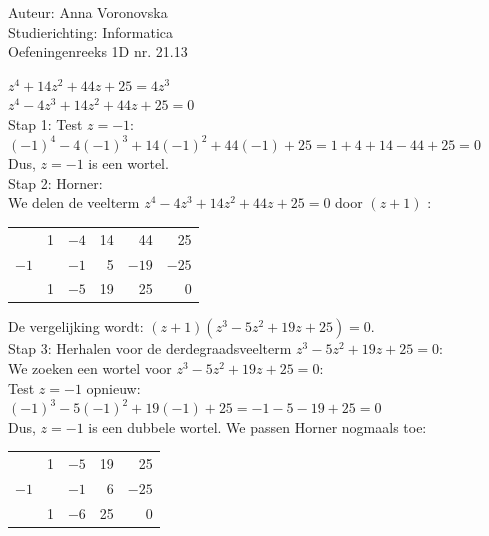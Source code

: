 \documentclass[a4paper]{article}
\begin{document}
  
\noindent \large Auteur: Anna Voronovska \\
\noindent \large Studierichting: Informatica\\
\noindent \large Oefeningenreeks 1D nr. 21.13\\

\medskip

\normalsize

$z^4 + 14z^2 + 44z + 25 = 4z^3$\\

$z^4 - 4z^3 + 14z^2 + 44z + 25 = 0$\\

Stap 1: Test $z = -1$:\\

$(-1)^4 - 4(-1)^3 + 14(-1)^2 + 44(-1) + 25 = 1 + 4 + 14 - 44 + 25 = 0$\\

Dus, $z = -1$ is een wortel.\\

Stap 2: Horner:\\

We delen de veelterm $z^4 - 4z^3 + 14z^2 + 44z + 25 = 0$ door $(z + 1)$ :

\begin{center}
\begin{tabular}{c|rrrr|r}
   & 1 & $-4$ & 14 & 44 & 25 \\
$-1$ &   & $-1$ & 5  & $-19$ & $-25$ \\ \hline
   & 1 & $-5$ & 19 & 25 & 0
\end{tabular}
\end{center}

De vergelijking wordt: $(z + 1)(z^3 - 5z^2 + 19z + 25) = 0$.\\

Stap 3: Herhalen voor de derdegraadsveelterm $z^3 - 5z^2 + 19z + 25 = 0$:\\

We zoeken een wortel voor $z^3 - 5z^2 + 19z + 25 = 0$:\\

Test $z = -1$ opnieuw:\\

$(-1)^3 - 5(-1)^2 + 19(-1) + 25 = -1 - 5 - 19 + 25 = 0$\\

Dus, $z = -1$ is een dubbele wortel. We passen Horner nogmaals toe:\\

\begin{center}
\begin{tabular}{c|rrr|r}
   & 1 & $-5$ & 19 & 25 \\
$-1$ &   & $-1$ & 6  & $-25$ \\ \hline
   & 1 & $-6$ & 25 & 0
\end{tabular}
\end{center}
\end{document}
